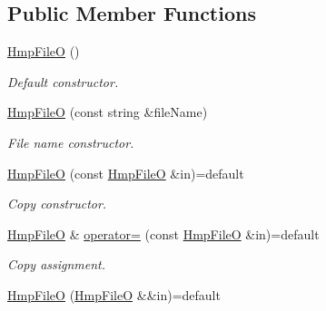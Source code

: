 \subsection*{Public Member Functions}
\begin{DoxyCompactItemize}
\item 
\mbox{\label{classsamp_files_1_1_hmp_file_o_a1e9b87d83403ac88fc508505d9951afd}} 
\hyperlink{classsamp_files_1_1_hmp_file_o_a1e9b87d83403ac88fc508505d9951afd}{Hmp\+FileO} ()
\begin{DoxyCompactList}\small\item\em Default constructor. \end{DoxyCompactList}\item 
\hyperlink{classsamp_files_1_1_hmp_file_o_af360694580dc1cf427b0b59375f0751f}{Hmp\+FileO} (const string \&file\+Name)
\begin{DoxyCompactList}\small\item\em File name constructor. \end{DoxyCompactList}\item 
\mbox{\label{classsamp_files_1_1_hmp_file_o_a11b3596fbf8f79d3b34a01e959cdde46}} 
\hyperlink{classsamp_files_1_1_hmp_file_o_a11b3596fbf8f79d3b34a01e959cdde46}{Hmp\+FileO} (const \hyperlink{classsamp_files_1_1_hmp_file_o}{Hmp\+FileO} \&in)=default
\begin{DoxyCompactList}\small\item\em Copy constructor. \end{DoxyCompactList}\item 
\mbox{\label{classsamp_files_1_1_hmp_file_o_a2dae478003580d4ef3e7437618ad1b8e}} 
\hyperlink{classsamp_files_1_1_hmp_file_o}{Hmp\+FileO} \& \hyperlink{classsamp_files_1_1_hmp_file_o_a2dae478003580d4ef3e7437618ad1b8e}{operator=} (const \hyperlink{classsamp_files_1_1_hmp_file_o}{Hmp\+FileO} \&in)=default
\begin{DoxyCompactList}\small\item\em Copy assignment. \end{DoxyCompactList}\item 
\mbox{\label{classsamp_files_1_1_hmp_file_o_acc71624d6213ede99b688a5a32b52111}} 
\hyperlink{classsamp_files_1_1_hmp_file_o_acc71624d6213ede99b688a5a32b52111}{Hmp\+FileO} (\hyperlink{classsamp_files_1_1_hmp_file_o}{Hmp\+FileO} \&\&in)=default

\end{DoxyCompactItemize}
